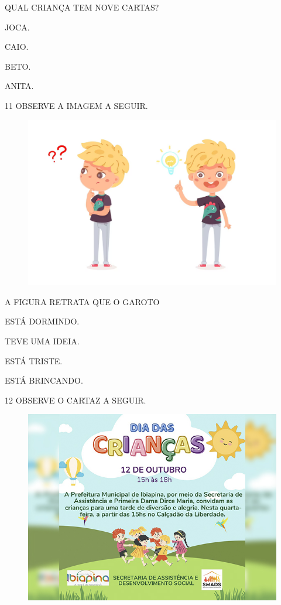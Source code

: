 QUAL CRIANÇA TEM NOVE CARTAS?

\begin{escolha}

\item JOCA.

\item CAIO.

\item BETO.

\item ANITA.

\end{escolha}

\num{11} OBSERVE A IMAGEM A SEGUIR.

\begin{figure}[H]
\centering
\includegraphics[width=.8\textwidth]{./media/image243.png}
\end{figure}

A FIGURA RETRATA QUE O GAROTO

\begin{escolha}

\item ESTÁ DORMINDO.

\item TEVE UMA IDEIA.

\item ESTÁ TRISTE.

\item ESTÁ BRINCANDO.

\end{escolha}

\num{12} OBSERVE O CARTAZ A SEGUIR.

\begin{figure}[H]
\centering
\includegraphics[width=.8\textwidth]{./media/image244.jpg}
\end{figure}

